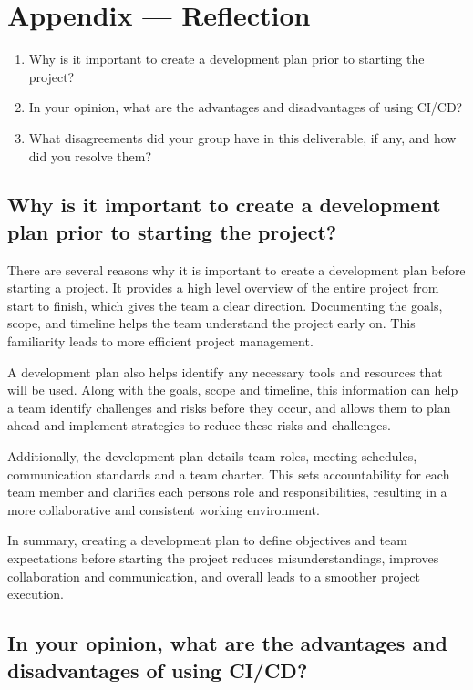 \documentclass{article}
\begin{document}
\newpage{}

\section*{Appendix --- Reflection}



\begin{enumerate}
    \item Why is it important to create a development plan prior to starting the
    project?
    \item In your opinion, what are the advantages and disadvantages of using
    CI/CD?
    \item What disagreements did your group have in this deliverable, if any,
    and how did you resolve them?
\end{enumerate}

\subsection*{Why is it important to create a development plan prior to starting the project?}

There are several reasons why it is important to create a development plan before starting a project.
It provides a high level overview of the entire project from start to finish, which gives the team a 
clear direction. Documenting the goals, scope, and timeline helps the team understand the project early 
on. This familiarity leads to more efficient project management.

A development plan also helps identify any necessary tools and resources that will be used. Along with the 
goals, scope and timeline, this information can help a team identify challenges and risks before they occur,
and allows them to plan ahead and implement strategies to reduce these risks and challenges. 

Additionally, the development plan details team roles, meeting schedules, communication standards and a 
team charter. This sets accountability for each team member and clarifies each persons role and responsibilities,
resulting in a more collaborative and consistent working environment.

In summary, creating a development plan to define objectives and team expectations before starting the project 
reduces misunderstandings, improves collaboration and communication, and overall leads to a smoother project execution. 

\subsection*{In your opinion, what are the advantages and disadvantages of using CI/CD?}
\end{document}
